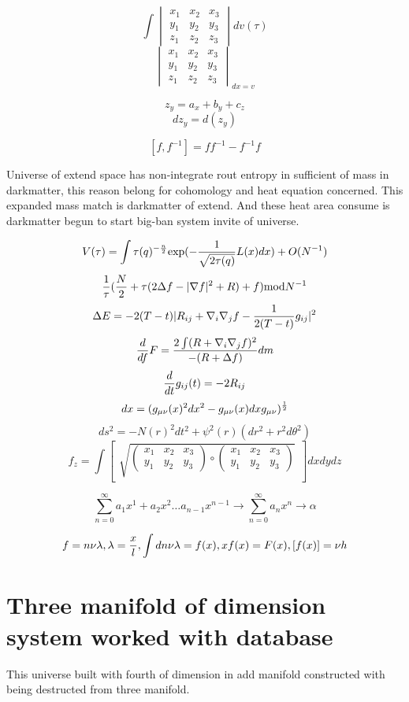 \documentclass{jsarticle}
\begin{document}
 $$ \int \begin{vmatrix} x_1 & x_2 & x_3 \\
    y_1 & y_2 & y_3 \\
    z_1 & z_2 & z_3 \end{vmatrix} dv({\tau}) $$
 $$ \begin{vmatrix} x_1 & x_2 & x_3 \\
    y_1 & y_2 & y_3 \\
    z_1 & z_2 & z_3 \end{vmatrix}_{dx=v}  $$


   $$ z_y = a_x + b_y + c_z $$
$$ dz_y = d(z_y) $$

$$ [f, f^{-1}] = ff^{-1} - f^{-1}f $$

  Universe of extend space has non-integrate rout entropy in sufficient of mass in darkmatter,
this reason belong for cohomology and heat equation concerned. This expanded mass match is darkmatter
of extend. And these heat area consume is darkmatter begun to start big-ban system invite of universe.

$$ V(\tau) = \int \tau(q)^{-{n \over 2}} \mathrm{exp}(-{1 \over \sqrt{2 \tau(q)}}L(x)dx) + O(N^{-1}) $$
$$ {1 \over \tau}({N \over 2} + \tau(2 \Delta f - |\nabla f|^2 + R) + f)\mathrm{mod}N^{-1} $$
	$$ \Delta E = -2(T - t)|R_{ij} + \nabla_{i} \nabla_{j} f - {1 \over 2(T - t)}g_{ij}|^2 $$
	$$ {d \over df}F = {2\int (R + \nabla_{i} \nabla_{j} f)^2 \over - (R + \Delta f)}dm $$
	$$ {d \over dt}g_{ij}(t) = - 2 R_{ij} $$
	$$ dx = (g_{\mu\nu}(x)^2dx^2 - g_{\mu\nu}(x)dxg_{\mu\nu})^{1 \over 2} $$
	$$ ds^2 = - N(r)^2dt^2 + \psi^2(r)(dr^2 + r^2d\theta^2) $$
  $$ f_{z} = \int \begin{bmatrix} \sqrt{\begin{pmatrix} x_{1} & x_{2} & x_{3} \\
     y_{1} & y_{2} & y_{3} \end{pmatrix}
     \circ
   \begin{pmatrix} x_{1} & x_{2} & x_{3} \\
     y_{1} & y_{2} & y_{3} \end{pmatrix}}_{}
     \end{bmatrix}dxdydz $$

     $$ \sum^{\infty}_{n=0}a_1x^1 + a_2x^2 \dots a_{n-1}x^{n-1} \to \sum^{\infty}_{n=0} a_nx^n \to \alpha $$

$$ f = n\nu\lambda , \lambda = {x \over l},
 \int dn \nu \lambda = f(x), 
 xf(x) = F(x),
 [f(x)] = \nu h$$

\section{Three manifold of dimension system worked with database}
  This universe built with fourth of dimension in add manifold constructed with being destructed from three manifold.
\end{document}
